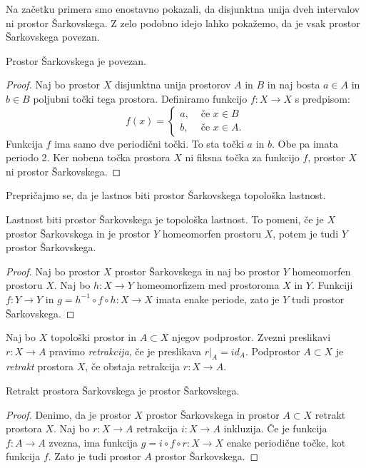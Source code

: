 \documentclass[mat2]{fmfdelo}
\begin{document}
Na začetku primera smo enostavno pokazali, da disjunktna unija dveh intervalov ni prostor Šarkovskega. Z zelo podobno idejo lahko pokažemo, da je vsak prostor Šarkovskega povezan.

\begin{trditev}
Prostor Šarkovskega je povezan.
\end{trditev}
\begin{proof}
Naj bo prostor $X$ disjunktna unija prostorov $A$ in $B$ in naj bosta $a \in A$ in $b \in B$ poljubni točki tega prostora. Definiramo funkcijo $f:X \to X$ s predpisom:
\[ f(x) = \begin{cases}
  a, & \mbox{ če $x \in B $}\\
  b ,& \mbox{ če $x \in A$.}
  \end{cases}
  \]
Funkcija $f$ ima samo dve periodični točki. To sta točki $a$ in $b$. Obe pa imata periodo 2. Ker nobena točka prostora $X$ ni fiksna točka za funkcijo $f$, prostor $X$ ni prostor Šarkovskega.
\end{proof}

Prepričajmo se, da je lastnos biti prostor Šarkovskega topološka lastnost.

\begin{trditev}
Lastnost biti prostor Šarkovskega je topološka lastnost. To pomeni, če je $X$ prostor Šarkovskega in je prostor $Y$ homeomorfen prostoru $X$, potem je tudi $Y$ prostor Šarkovskega.
\end{trditev}
\begin{proof}
Naj bo prostor $X$ prostor Šarkovskega in naj bo prostor $Y$ homeomorfen prostoru $X$. Naj bo $h : X \to Y$ homeomorfizem med prostoroma $X$ in $Y$. Funkciji $f : Y \to Y$ in $g = h^{-1} \circ f \circ h : X \to X$ imata enake periode, zato je $Y$ tudi prostor Šarkovskega.
\end{proof}



\begin{definicija}
Naj bo $X$ topološki prostor in $A \subset X$ njegov podprostor. Zvezni preslikavi $r : X \to A$ pravimo \emph{retrakcija}, če je preslikava $r|_A = id_A$. Podprostor $A \subset X$ je \emph{retrakt} prostora $X$, če obstaja retrakcija $r: X \to A$.
\end{definicija}

\begin{trditev}
Retrakt prostora Šarkovskega je prostor Šarkovskega.
\end{trditev}
\begin{proof}
Denimo, da je prostor $X$ prostor Šarkovskega in prostor $A \subset X$ retrakt prostora $X$. Naj bo $r : X \to A$ retrakcija $i : X \to A$ inkluzija. Če je funkcija $f : A \to A$ zvezna, ima funkcija $g = i \circ f \circ r : X \to X$ enake periodične točke, kot funkcija $f$. Zato je tudi prostor $A$ prostor Šarkovskega.
\end{proof}
\end{document}
